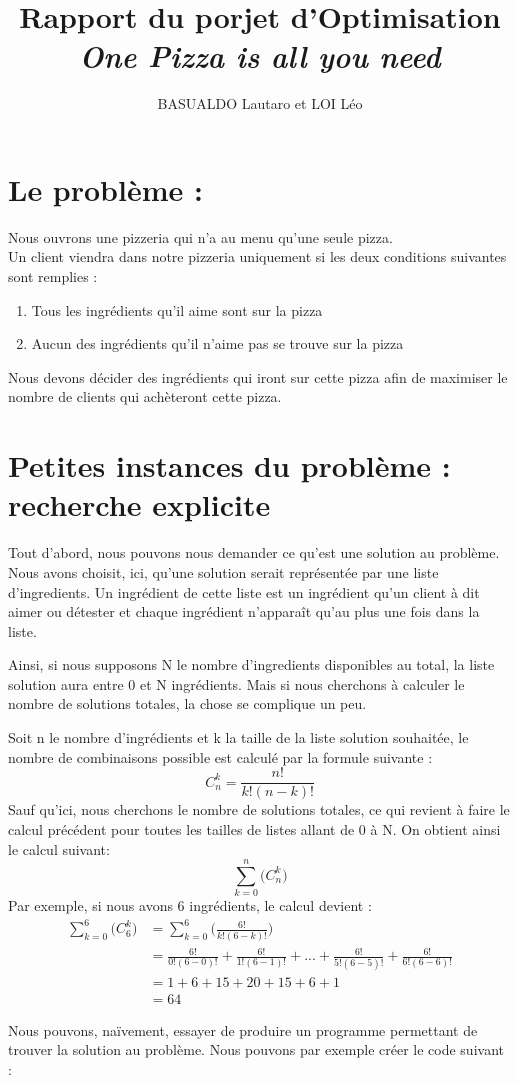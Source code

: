 \documentclass{article}
\title{Rapport du porjet d'Optimisation\newline
    \textit{One Pizza is all you need}}
\author{BASUALDO Lautaro et LOI Léo}
\begin{document}
\maketitle

\tableofcontents
\newpage

\section{Le problème :}

Nous ouvrons une pizzeria qui n'a au menu qu'une seule pizza.\\
Un client viendra dans notre pizzeria uniquement si les deux conditions suivantes sont remplies :
\begin{enumerate}
    \item Tous les ingrédients qu'il aime sont sur la pizza
    \item Aucun des ingrédients qu'il n'aime pas se trouve sur la pizza
\end{enumerate}
Nous devons décider des ingrédients qui iront sur cette pizza afin de maximiser le nombre de clients qui achèteront cette pizza.

\section{Petites instances du problème : recherche explicite}

Tout d'abord, nous pouvons nous demander ce qu'est une solution au problème.\newline
Nous avons choisit, ici, qu'une solution serait représentée par une liste d'ingredients.
Un ingrédient de cette liste est un ingrédient qu'un client à dit aimer ou détester et chaque ingrédient n'apparaît qu'au plus une fois dans la liste.

Ainsi, si nous supposons N le nombre d'ingredients disponibles au total, la liste solution aura entre 0 et N ingrédients.\newline
Mais si nous cherchons à calculer le nombre de solutions totales, la chose se complique un peu.

Soit n le nombre d'ingrédients et k la taille de la liste solution souhaitée, le nombre de combinaisons possible est calculé par la formule suivante :
$$C_{n}^{k}=\frac{n!}{k!(n-k)!}$$
Sauf qu'ici, nous cherchons le nombre de solutions totales, ce qui revient à faire le calcul précédent pour toutes les tailles de listes allant de 0 à N.\newline
On obtient ainsi le calcul suivant:
$$\sum_{k=0}^{n}\bigl(C_{n}^{k}\bigr)$$
Par exemple, si nous avons 6 ingrédients, le calcul devient :
\begin{align*}
    \sum_{k=0}^{6}\bigl(C_{6}^{k}\bigr)&=\sum_{k=0}^{6}\bigl(\frac{6!}{k!(6-k)!}\bigr)\\
    &=\frac{6!}{0!(6-0)!}+\frac{6!}{1!(6-1)!}+...+\frac{6!}{5!(6-5)!}+\frac{6!}{6!(6-6)!}\\
    &= 1 + 6 + 15 + 20 + 15 + 6 + 1\\
    &=64
\end{align*}

Nous pouvons, naïvement, essayer de produire un programme permettant de trouver la solution au problème.\newline
Nous pouvons par exemple créer le code suivant : 

\end{document}
